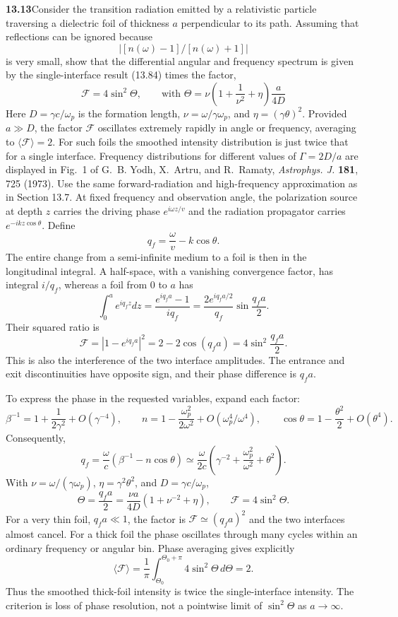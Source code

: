 \par\bigskip
\noindent\textbf{13.13}\quad Consider the transition radiation emitted by a relativistic particle traversing a dielectric foil of thickness $a$ perpendicular to its path. Assuming that reflections can be ignored because
\[
|[n(\omega)-1]/[n(\omega)+1]|
\]
is very small, show that the differential angular and frequency spectrum is given by the single-interface result (13.84) times the factor,
\[
\mathcal{F}=4\sin^{2}\Theta,\qquad\text{with }\Theta=\nu\!\left(1+\frac{1}{\nu^{2}}+\eta\right)\!\frac{a}{4D}
\]
Here $D=\gamma c/\omega_{p}$ is the formation length, $\nu=\omega/\gamma\omega_{p}$, and $\eta=(\gamma\theta)^{2}$. Provided $a\gg D$, the factor $\mathcal{F}$ oscillates extremely rapidly in angle or frequency, averaging to $\langle\mathcal{F}\rangle=2$. For such foils the smoothed intensity distribution is just twice that for a single interface. Frequency distributions for different values of $\Gamma=2D/a$ are displayed in Fig.~1 of G.~B. Yodh, X.~Artru, and R.~Ramaty, \emph{Astrophys. J.} \textbf{181}, 725 (1973).
\solution
Use the same forward-radiation and high-frequency approximation as in
Section 13.7. At fixed frequency and observation angle, the polarization
source at depth $z$ carries the driving phase $e^{i\omega z/v}$ and
the radiation propagator carries $e^{-ikz\cos\theta}$. Define
\[
 q_f=\frac{\omega}{v}-k\cos\theta.
\]
The entire change from a semi-infinite medium to a foil is then in the
longitudinal integral. A half-space, with a vanishing convergence factor,
has integral $i/q_f$, whereas a foil from $0$ to $a$ has
\[
 \int_0^a e^{iq_fz}dz=\frac{e^{iq_fa}-1}{iq_f}
 =\frac{2e^{iq_fa/2}}{q_f}\sin\frac{q_fa}{2}.
\]
Their squared ratio is
\[
 \boxed{\mathcal F=|1-e^{iq_fa}|^2
       =2-2\cos(q_fa)=4\sin^2\frac{q_fa}{2}.}
\]
This is also the interference of the two interface amplitudes. The
entrance and exit discontinuities have opposite sign, and their phase
difference is $q_fa$.

To express the phase in the requested variables, expand each factor:
\[
 \beta^{-1}=1+\frac1{2\gamma^2}+O(\gamma^{-4}),\qquad
 n=1-\frac{\omega_p^2}{2\omega^2}+O(\omega_p^4/\omega^4),
 \qquad
 \cos\theta=1-\frac{\theta^2}{2}+O(\theta^4).
\]
Consequently,
\[
 q_f=\frac\omega c(\beta^{-1}-n\cos\theta)
 \simeq\frac{\omega}{2c}
       \left(\gamma^{-2}+\frac{\omega_p^2}{\omega^2}+\theta^2\right).
\]
With $\nu=\omega/(\gamma\omega_p)$, $\eta=\gamma^2\theta^2$,
and $D=\gamma c/\omega_p$,
\[
 \boxed{\Theta=\frac{q_fa}{2}
 =\frac{\nu a}{4D}(1+\nu^{-2}+\eta),\qquad
 \mathcal F=4\sin^2\Theta.}
\]
For a very thin foil, $q_fa\ll1$, the factor is
$\mathcal F\simeq(q_fa)^2$ and the two interfaces almost cancel.
For a thick foil the phase oscillates through many cycles within an
ordinary frequency or angular bin. Phase averaging gives explicitly
\[
 \langle\mathcal F\rangle=
 \frac1\pi\int_{\Theta_0}^{\Theta_0+\pi}4\sin^2\Theta\,d\Theta=2.
\]
Thus the smoothed thick-foil intensity is twice the single-interface
intensity. The criterion is loss of phase resolution, not a pointwise
limit of $\sin^2\Theta$ as $a\to\infty$.



